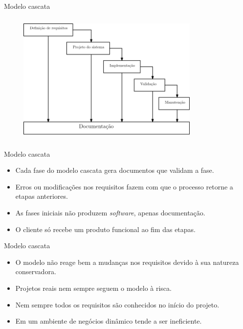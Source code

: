 \documentclass[11pt]{beamer}
\begin{document}
   \begin{frame}{Modelo cascata}
      \begin{figure}[ht]
        \centering
        \includegraphics[height=6.6cm, width=9cm]{figures/cascata.png}
      \end{figure}
   \end{frame}

   \begin{frame}{Modelo cascata}
      \begin{itemize}
         \item Cada fase do modelo cascata gera documentos que validam a fase.
         \item Erros ou modificações nos requisitos fazem com que o processo retorne a etapas anteriores.
         \item As fases iniciais não produzem \textit{software}, apenas documentação.
         \item O cliente só recebe um produto funcional ao fim das etapas.
      \end{itemize}
   \end{frame}

   \begin{frame}{Modelo cascata}
      \begin{itemize}
         \item O modelo não reage bem a mudanças nos requisitos devido à sua natureza conservadora.
         \item Projetos reais nem sempre seguem o modelo à risca.
         \item Nem sempre todos os requisitos são conhecidos no início do projeto.
         \item Em um ambiente de negócios dinâmico tende a ser ineficiente.
      \end{itemize}
   \end{frame}
\end{document}
